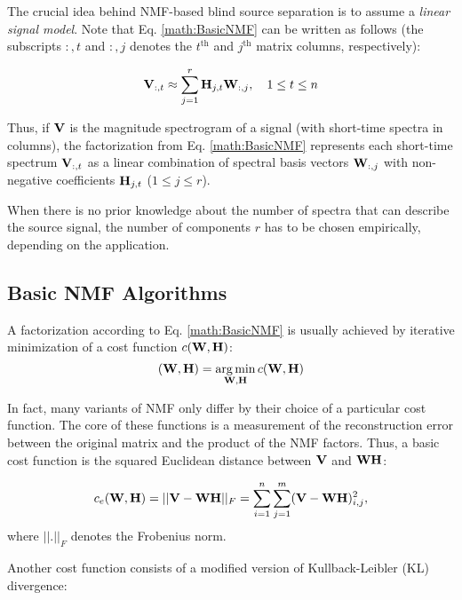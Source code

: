 The crucial idea behind NMF-based blind source separation is to assume a
\emph{linear signal model}. Note that Eq. \ref{math:BasicNMF} can be written as
follows (the subscripts $:,t$ and $:,j$ denotes the $t^{\textrm{th}}$ and
$j^{\textrm{th}}$ matrix columns, respectively):

\begin{equation}
    \label{math:LinSigMod}
    \mathbf{V}_{:,t} \approx \sum\limits_{j=1}^r \mathbf{H}_{j,t} \mathbf{W}_{:,j}, \quad 1 \leq t \leq n
\end{equation}

Thus, if $\mathbf{V}$ is the magnitude spectrogram of a signal (with short-time spectra
in columns), the factorization from Eq. \ref{math:BasicNMF} represents each short-time spectrum
$\mathbf{V}_{:,t}$ as a linear combination of spectral basis vectors
$\mathbf{W}_{:,j}$ with non-negative coefficients
$\mathbf{H}_{j,t}$ ($1 \leq j \leq r$). 


When there is no prior knowledge about the number of spectra that can describe
the source signal, the number of components $r$ has to be chosen empirically,
depending on the application.

\subsection{Basic NMF Algorithms}
\label{section:NMFAlg}

A factorization according to Eq. \ref{math:BasicNMF} is usually achieved by
iterative minimization of a cost function $c(\mathbf{W},\mathbf{H})$:
\begin{equation}
    \label{math:minimi}
    (\mathbf{W},\mathbf{H}) = \operatorname*{arg\,min}\limits_{\mathbf{W},\mathbf{H}} c(\mathbf{W},\mathbf{H}) 
\end{equation}

In fact, many variants of NMF only differ by their choice of a particular cost
function.  The core of these functions is a measurement of the reconstruction
error between the original matrix and the product of the NMF factors.  Thus, a
basic cost function is the squared Euclidean distance between $\mathbf{V}$ and
$\mathbf{WH}$:

\begin{equation}
    \label{math:eudist}
    c_e(\mathbf{W},\mathbf{H}) = 
    ||\mathbf{V}-\mathbf{WH}||_F = 
    \sum_{i=1}^n \sum_{j=1}^m (\mathbf{V}-\mathbf{WH})_{i,j}^2 ,
\end{equation}
where $||.||_F$ denotes the Frobenius norm.  

Another cost function consists of a modified version of Kullback-Leibler (KL) divergence:

